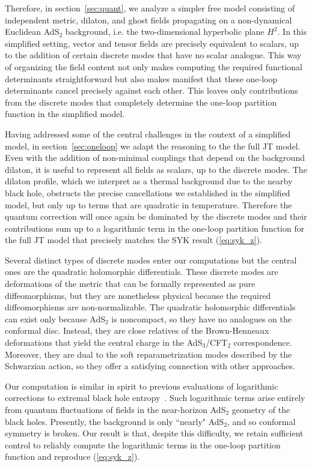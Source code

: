 \documentclass[12pt]{article}
\begin{document}
Therefore, in section~\ref{sec:quant}, we analyze a simpler free model consisting of independent metric, dilaton, and ghost fields propagating on a non-dynamical Euclidean AdS$_2$ background, i.e. the two-dimensional hyperbolic plane $H^2$. In this simplified setting, vector and tensor fields are precisely equivalent to scalars, up to the addition of certain discrete modes that have no scalar analogue. This way of organizing the field content not only makes computing the required functional determinants straightforward but also makes manifest that these one-loop determinants cancel precisely against each other. This leaves only contributions from the discrete modes that completely determine the one-loop partition function in the simplified model.
 

Having addressed some of the central challenges in the context of a simplified model, in section~\ref{sec:oneloop} we adapt the reasoning to the the full JT model. Even with the addition of non-minimal couplings that depend on the background dilaton, it is useful to represent all fields as scalars, up to the discrete modes. The dilaton profile, which we interpret as a thermal background due to the nearby black hole, obstructs the precise cancellations we established in the simplified model, but only up to terms that are quadratic in temperature. Therefore the quantum correction will once again be dominated by the discrete modes and their contributions sum up to a logarithmic term in the one-loop partition function for the full JT model that precisely matches the SYK result (\ref{eq:syk_z}).

Several distinct types of discrete modes enter our computations but the central ones are the quadratic holomorphic differentials. These discrete modes are deformations of the metric that can be formally represented as pure diffeomorphisms, but they are nonetheless physical because the required diffeomorphisms are non-normalizable. The
quadratic holomorphic differentials can exist only because AdS$_2$ is noncompact, so they have no analogues on the conformal disc. Instead, they are close relatives of the Brown-Henneaux deformations that yield the central charge in the AdS$_3$/CFT$_2$ correspondence. Moreover, they are dual to the soft reparametrization modes described by the Schwarzian action, so they offer a satisfying connection with other approaches. 


Our computation is similar in spirit to previous evaluations of logarithmic corrections to extremal black hole entropy~\cite{Banerjee:2010qc,Banerjee:2011jp,Sen:2011ba,Keeler:2014bra,Larsen:2014bqa}. 
Such logarithmic terms arise entirely from quantum fluctuations of fields in the near-horizon AdS$_2$ geometry of the black holes. Presently, the background is only ``nearly" AdS$_2$, and so conformal symmetry is broken. Our result is that, despite this difficulty, we retain sufficient control to reliably compute the logarithmic terms in the one-loop partition function and reproduce (\ref{eq:syk_z}).  
\end{document}
